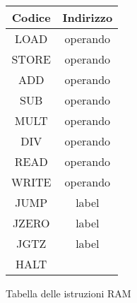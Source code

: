 \begin{figure}[!h]
    \centering
    \begin{tabular}{|c c|}
        \hline
        Codice & Indirizzo \\
        \hline
        LOAD   & operando  \\
        STORE  & operando  \\
        ADD    & operando  \\
        SUB    & operando  \\
        MULT   & operando  \\
        DIV    & operando  \\
        READ   & operando  \\
        WRITE  & operando  \\
        JUMP   & label     \\
        JZERO  & label     \\
        JGTZ   & label     \\
        HALT   &           \\
        \hline
    \end{tabular}
    \caption{Tabella delle istruzioni RAM}
    \label{Fig:1}
\end{figure}